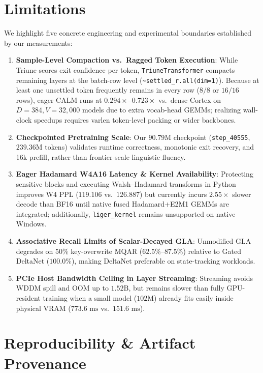 \documentclass[10pt,twocolumn,letterpaper]{article}
\begin{document}
\section{Limitations}

We highlight five concrete engineering and experimental boundaries established by our measurements:
\begin{enumerate}
    \item \textbf{Sample-Level Compaction vs.\ Ragged Token Execution}: While Triune scores exit confidence per token, \texttt{TriuneTransformer} compacts remaining layers at the batch-row level (\texttt{\textasciitilde settled\_r.all(dim=1)}). Because at least one unsettled token frequently remains in every row ($8/8$ or $16/16$ rows), eager CALM runs at $0.294\times\text{--}0.723\times$ vs.\ dense Cortex on $D=384, V=32,000$ models due to extra vocab-head GEMMs; realizing wall-clock speedups requires varlen token-level packing or wider backbones.
    \item \textbf{Checkpointed Pretraining Scale}: Our $90.79\text{M}$ checkpoint (\texttt{step\_40555}, $239.36\text{M}$ tokens) validates runtime correctness, monotonic exit recovery, and 16k prefill, rather than frontier-scale linguistic fluency.
    \item \textbf{Eager Hadamard W4A16 Latency \& Kernel Availability}: Protecting sensitive blocks and executing Walsh--Hadamard transforms in Python improves W4 PPL ($119.106$ vs.\ $126.887$) but currently incurs $2.55\times$ slower decode than BF16 until native fused Hadamard+E2M1 GEMMs are integrated; additionally, \texttt{liger\_kernel} remains unsupported on native Windows.
    \item \textbf{Associative Recall Limits of Scalar-Decayed GLA}: Unmodified GLA degrades on $50\%$ key-overwrite MQAR ($62.5\%\text{--}87.5\%$) relative to Gated DeltaNet ($100.0\%$), making DeltaNet preferable on state-tracking workloads.
    \item \textbf{PCIe Host Bandwidth Ceiling in Layer Streaming}: Streaming avoids WDDM spill and OOM up to $1.52\text{B}$, but remains slower than fully GPU-resident training when a small model ($102\text{M}$) already fits easily inside physical VRAM ($773.6\text{ ms}$ vs.\ $151.6\text{ ms}$).
\end{enumerate}

\section{Reproducibility \& Artifact Provenance}
\end{document}
